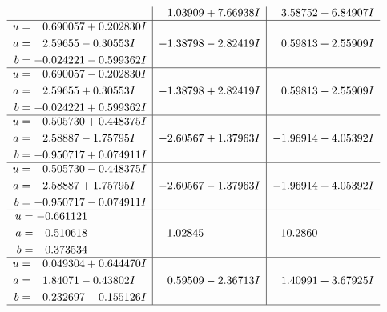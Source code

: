 \documentclass[1p]{elsarticle_modified}
\theoremstyle{definition}
\begin{document}
$$\begin{array}{c|c|c}
 & \phantom{-}1.03909 + 7.66938 I & \phantom{-}3.58752 - 6.84907 I \\ \hline\begin{aligned}
u &= \phantom{-}0.690057 + 0.202830 I \\
a &= \phantom{-}2.59655 - 0.30553 I \\
b &= -0.024221 - 0.599362 I\end{aligned}
 & -1.38798 - 2.82419 I & \phantom{-}0.59813 + 2.55909 I \\ \hline\begin{aligned}
u &= \phantom{-}0.690057 - 0.202830 I \\
a &= \phantom{-}2.59655 + 0.30553 I \\
b &= -0.024221 + 0.599362 I\end{aligned}
 & -1.38798 + 2.82419 I & \phantom{-}0.59813 - 2.55909 I \\ \hline\begin{aligned}
u &= \phantom{-}0.505730 + 0.448375 I \\
a &= \phantom{-}2.58887 - 1.75795 I \\
b &= -0.950717 + 0.074911 I\end{aligned}
 & -2.60567 + 1.37963 I & -1.96914 - 4.05392 I \\ \hline\begin{aligned}
u &= \phantom{-}0.505730 - 0.448375 I \\
a &= \phantom{-}2.58887 + 1.75795 I \\
b &= -0.950717 - 0.074911 I\end{aligned}
 & -2.60567 - 1.37963 I & -1.96914 + 4.05392 I \\ \hline\begin{aligned}
u &= -0.661121\phantom{ +0.000000I} \\
a &= \phantom{-}0.510618\phantom{ +0.000000I} \\
b &= \phantom{-}0.373534\phantom{ +0.000000I}\end{aligned}
 & \phantom{-}1.02845\phantom{ +0.000000I} & \phantom{-}10.2860\phantom{ +0.000000I} \\ \hline\begin{aligned}
u &= \phantom{-}0.049304 + 0.644470 I \\
a &= \phantom{-}1.84071 - 0.43802 I \\
b &= \phantom{-}0.232697 - 0.155126 I\end{aligned}
 & \phantom{-}0.59509 - 2.36713 I & \phantom{-}1.40991 + 3.67925 I\\
 \hline 
 \end{array}$$\newpage$$\begin{array}{c|c|c}  

\end{array}$$
\end{document}
